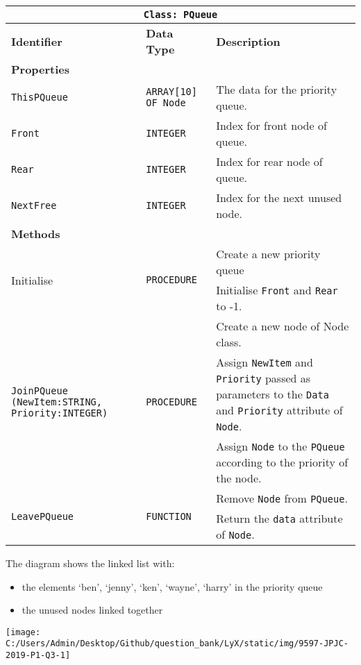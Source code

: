 \begin{center}
\begin{tabular}{|l|l|l|}
\hline 
\multicolumn{3}{|c|}{\texttt{Class: PQueue}}\tabularnewline
\hline 
\texttt{\textbf{\hspace{0.01\columnwidth}}}\textbf{Identifier} & \texttt{\textbf{\hspace{0.01\columnwidth}}}\textbf{Data Type} & \texttt{\textbf{\hspace{0.05\columnwidth}}}\textbf{Description}\tabularnewline
\hline 
\multicolumn{3}{|l|}{\textbf{Properties}}\tabularnewline
\hline 
\texttt{ThisPQueue} & \texttt{ARRAY{[}10{]} OF Node} & The data for the priority queue.\tabularnewline
\hline 
\texttt{Front} & \texttt{INTEGER} & Index for front node of queue. \tabularnewline
\hline 
\texttt{Rear} & \texttt{INTEGER} & Index for rear node of queue. \tabularnewline
\hline 
\texttt{NextFree} & \texttt{INTEGER} & Index for the next unused node.\tabularnewline
\hline 
\multicolumn{3}{|l|}{\textbf{Methods}}\tabularnewline
\hline 
\multirow{2}{*}{Initialise} & \multirow{2}{*}{\texttt{PROCEDURE}} & \textbullet{} Create a new priority queue \tabularnewline
 &  & \textbullet{} Initialise \texttt{Front} and \texttt{Rear} to -1.\tabularnewline
\hline 
\multirow{3}{*}{\texttt{JoinPQueue (NewItem:STRING, Priority:INTEGER)}} & \multirow{3}{*}{\texttt{PROCEDURE}} & \textbullet{} Create a new node of Node class.\tabularnewline
 &  & \textbullet{} Assign \texttt{NewItem} and \texttt{Priority} passed
as parameters to the \texttt{Data} and \texttt{Priority} attribute
of \texttt{Node}.\tabularnewline
 &  & \textbullet{} Assign \texttt{Node} to the \texttt{PQueue} according
to the priority of the node.\tabularnewline
\hline 
\multirow{2}{*}{\texttt{LeavePQueue}} & \multirow{2}{*}{\texttt{FUNCTION}} & \textbullet{} Remove \texttt{Node} from \texttt{PQueue}.\tabularnewline
 &  & \textbullet{} Return the \texttt{data} attribute of \texttt{Node}. \tabularnewline
\hline 
\end{tabular}
\par\end{center}

The diagram shows the linked list with: 
\begin{itemize}
\item the elements \textquoteleft ben\textquoteright , \textquoteleft jenny\textquoteright ,
\textquoteleft ken\textquoteright , \textquoteleft wayne\textquoteright ,
\textquoteleft harry\textquoteright{} in the priority queue
\item the unused nodes linked together
\end{itemize}
\begin{center}
\texttt{[image: C:/Users/Admin/Desktop/Github/question\_bank/LyX/static/img/9597-JPJC-2019-P1-Q3-1]}
\par\end{center}

